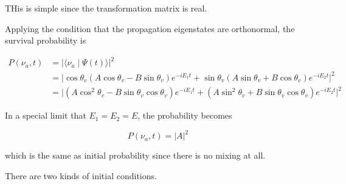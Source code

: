 \documentclass{tufte-handout}
\newcommand{\braket}[2]{\langle #1 \mid #2 \rangle}
\begin{document}
THis is simple since the transformation matrix is real.

Applying the condition that the propagation eigenstates are orthonormal, the survival probability is

\begin{align*}
    P(\nu_a,t) & = \lvert \braket{\nu_a}{\Psi(t)}\rvert^2 \\
    & = \lvert \cos\theta_v (A\cos\theta_v -B\sin\theta_v) e^{-iE_1t} + \sin\theta_v(A\sin\theta_v + B \cos\theta_v) e^{-iE_2t} \rvert^2\\
    & =\lvert ( A \cos^2\theta_v - B \sin\theta_v \cos\theta_v ) e^{-iE_1t} + ( A \sin^2\theta_v + B \sin\theta_v \cos\theta_v )e^{-iE_2t} \rvert^2
\end{align*}

In a special limit that $E_1=E_2=E$, the probability becomes

\begin{equation}
    P(\nu_a,t) = \lvert A\rvert^2 
\end{equation}

which is the same as initial probability since there is no mixing at all.

There are two kinds of initial conditions.
\end{document}
